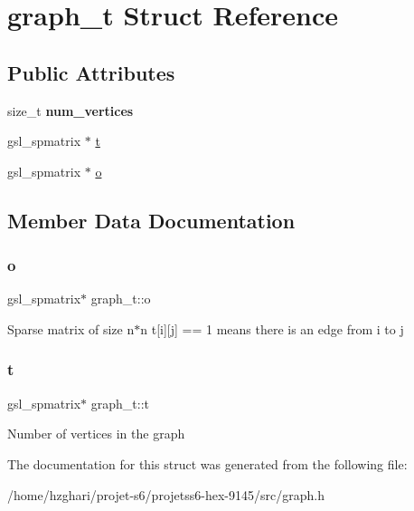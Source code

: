 \hypertarget{structgraph__t}{}\section{graph\+\_\+t Struct Reference}
\label{structgraph__t}
\subsection*{Public Attributes}
\begin{DoxyCompactItemize}
\item 
\mbox{\label{structgraph__t_a96fc395f8058e79976b30ef65dc45451}} 
size\+\_\+t {\bfseries num\+\_\+vertices}
\item 
gsl\+\_\+spmatrix $\ast$ \hyperlink{structgraph__t_a1dc922c0965ced559eb1f7a480dd07f4}{t}
\item 
gsl\+\_\+spmatrix $\ast$ \hyperlink{structgraph__t_ad9dd0592ff4e287195dbfc12409ec3b5}{o}
\end{DoxyCompactItemize}


\subsection{Member Data Documentation}
\mbox{\label{structgraph__t_ad9dd0592ff4e287195dbfc12409ec3b5}} 
\subsubsection{\texorpdfstring{o}{o}}
{\footnotesize\ttfamily gsl\+\_\+spmatrix$\ast$ graph\+\_\+t\+::o}

Sparse matrix of size n$\ast$n t\mbox{[}i\mbox{]}\mbox{[}j\mbox{]} == 1 means there is an edge from i to j \mbox{\label{structgraph__t_a1dc922c0965ced559eb1f7a480dd07f4}} 
\subsubsection{\texorpdfstring{t}{t}}
{\footnotesize\ttfamily gsl\+\_\+spmatrix$\ast$ graph\+\_\+t\+::t}

Number of vertices in the graph 

The documentation for this struct was generated from the following file\+:\begin{DoxyCompactItemize}
\item 
/home/hzghari/projet-\/s6/projetss6-\/hex-\/9145/src/graph.\+h\end{DoxyCompactItemize}
